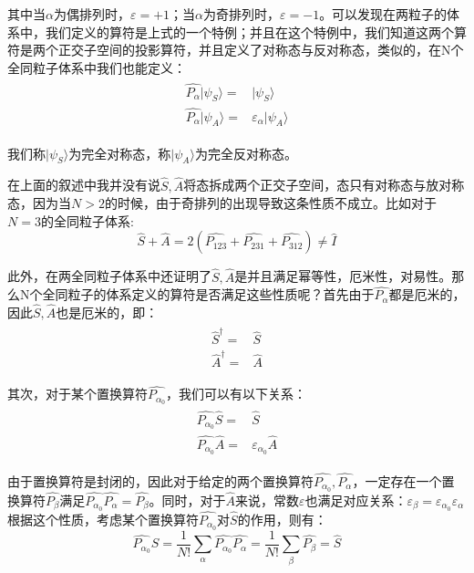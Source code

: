     其中当$\alpha$为偶排列时，$\varepsilon=+1$；当$\alpha$为奇排列时，$\varepsilon=-1$。可以发现在两粒子的体系中，我们定义的算符是上式的一个特例；并且在这个特例中，我们知道这两个算符是两个正交子空间的投影算符，并且定义了对称态与反对称态，类似的，在N个全同粒子体系中我们也能定义：
    \begin{align}
        \begin{split}
            \hat{P_\alpha}|\psi_S\rangle=&|\psi_S\rangle\\
            \hat{P_\alpha}|\psi_A\rangle=&\varepsilon_\alpha|\psi_A\rangle
        \end{split}
    \end{align}
    
    我们称$|\psi_S\rangle$为完全对称态，称$|\psi_A\rangle$为完全反对称态。
    \begin{remark}
    在上面的叙述中我并没有说$\hat{S},\hat{A}$将态拆成两个正交子空间，态只有对称态与放对称态，因为当$N>2$的时候，由于奇排列的出现导致这条性质不成立。比如对于$N=3$的全同粒子体系:
    \begin{equation}
        \hat{S}+\hat{A}=2(\hat{P_{123}}+\hat{P_{231}}+\hat{P_{312}})\ne \hat{I}
    \end{equation}
    \end{remark}
    
    此外，在两全同粒子体系中还证明了$\hat{S},\hat{A}$是并且满足幂等性，厄米性，对易性。那么N个全同粒子的体系定义的算符是否满足这些性质呢？首先由于$\hat{P_\alpha}$都是厄米的，因此$\hat{S},\hat{A}$也是厄米的，即：
    \begin{align}
        \begin{split}
            \hat{S}^\dagger=&\hat{S}\\
            \hat{A}^\dagger=&\hat{A}
        \end{split}
    \end{align}
    
    其次，对于某个置换算符$\hat{P_{\alpha_0}}$，我们可以有以下关系：
    \begin{align}\label{equ11:B}
        \begin{split}
            \hat{P_{\alpha_0}}\hat{S}=&\hat{S}\\
            \hat{P_{\alpha_0}}\hat{A}=&\varepsilon_{\alpha_0}\hat{A}
        \end{split}
    \end{align}
    
    由于置换算符是封闭的，因此对于给定的两个置换算符$\hat{P_{\alpha_0}},\hat{P_\alpha}$，一定存在一个置换算符$\hat{P_\beta}$满足$\hat{P_{\alpha_0}}\hat{P_\alpha}=\hat{P_\beta}$。同时，对于$\hat{A}$来说，常数$\varepsilon$也满足对应关系：$\varepsilon_\beta=\varepsilon_{\alpha_0}\varepsilon_\alpha$根据这个性质，考虑某个置换算符$\hat{P_{\alpha_0}}$对$\hat{S}$的作用，则有：
    \begin{equation}
        \hat{P_{\alpha_0}}\hat{S}=\frac{1}{N!}\sum_\alpha \hat{P_{\alpha_0}}\hat{P_\alpha}=\frac{1}{N!}\sum_\beta \hat{P_\beta}=\hat{S}
    \end{equation}
    
